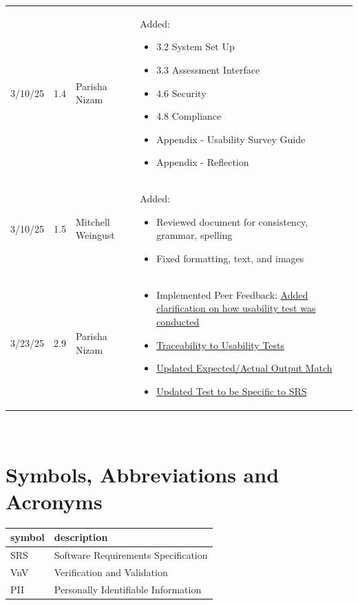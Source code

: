 \documentclass[12pt, titlepage]{article}
\begin{document}
\begin{table}[hp]
\begin{tabularx}{\textwidth}{p{1.5cm}p{1cm}p{3.5cm}X}
  3/10/25 & 1.4 & Parisha Nizam & Added:\begin{itemize}[leftmargin=*]
    \item 3.2 System Set Up
    \item 3.3 Assessment Interface
    \item 4.6 Security
    \item 4.8 Compliance 
    \item Appendix - Usability Survey Guide
    \item Appendix - Reflection
  \end{itemize}\\
  3/10/25 & 1.5 & Mitchell Weingust & Added:\begin{itemize}[leftmargin=*]
    \item Reviewed document for consistency, grammar, spelling
    \item Fixed formatting, text, and images
  \end{itemize}\\
  3/23/25 & 2.9 & Parisha Nizam & \begin{itemize}[leftmargin=*]
    \item Implemented Peer Feedback: \href{https://github.com/parishanizam/TeleHealth/issues/535}{Added clarification on how usability test was conducted}
    \item \href{https://github.com/parishanizam/TeleHealth/issues/537}{Traceability to Usability Tests}
    \item \href{https://github.com/parishanizam/TeleHealth/issues/536}{Updated Expected/Actual Output Match}
    \item \href{https://github.com/parishanizam/TeleHealth/issues/539}{Updated Test to be Specific to SRS}
  \end{itemize}\\

  \bottomrule
  \end{tabularx}
  \end{table}

~\newpage

\section{Symbols, Abbreviations and Acronyms}

\renewcommand{\arraystretch}{1.2}
\begin{tabular}{l l} 
  \toprule		
  \textbf{symbol} & \textbf{description}\\
  \midrule 
  SRS & Software Requirements Specification\\
  VnV & Verification and Validation\\
  PII & Personally Identifiable Information\\
  \bottomrule
\end{tabular}\\
\end{document}
